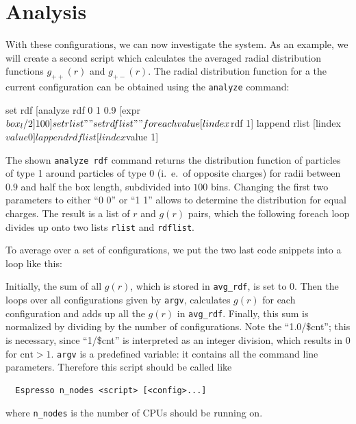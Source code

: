 \documentclass[
a4paper,                        %
11pt,                           %
twoside,                        %
footsepline,                    %
headsepline,                    %
headexclude,                    %
footexclude,                    %
pagesize,                       %
]{scrartcl}
\begin{document}
\section{Analysis}

With these configurations, we can now investigate the system. As an
example, we will create a second script which calculates the averaged
radial distribution functions $g_{++}(r)$ and $g_{+-}(r)$. The radial
distribution function for a the current configuration can be obtained
using the \verb|analyze| command:
\begin{tclcode}
  set rdf [analyze rdf 0 1 0.9 [expr $box_l/2] 100] set rlist "" set
  rdflist "" foreach value [lindex $rdf 1] { lappend rlist [lindex
    $value 0] lappend rdflist [lindex $value 1] }
\end{tclcode}
The shown \verb|analyze rdf| command returns the distribution function
of particles of type 1 around particles of type 0 (i.~e.\ of opposite
charges) for radii between $0.9$ and half the box length, subdivided
into $100$ bins.  Changing the first two parameters to either ``0 0''
or ``1 1'' allows to determine the distribution for equal charges. The
result is a list of $r$ and $g(r)$ pairs, which the following foreach
loop divides up onto two lists \verb|rlist| and \verb|rdflist|.

To average over a set of configurations, we put the two last code
snippets into a loop like this:
Initially, the sum of all $g(r)$, which is stored in \verb|avg_rdf|,
is set to 0.  Then the loops over all configurations given by
\verb|argv|, calculates $g(r)$ for each configuration and adds up all
the $g(r)$ in \verb|avg_rdf|.  Finally, this sum is normalized by
dividing by the number of configurations. Note the ``1.0/\$cnt''; this
is necessary, since ``1/\$cnt'' is interpreted as an integer division,
which results in 0 for $\text{cnt}>1$.  \verb|argv| is a predefined
variable: it contains all the command line parameters. Therefore this
script should be called like
\begin{verbatim}
  Espresso n_nodes <script> [<config>...]
\end{verbatim}
where \verb|n_nodes| is the number of CPUs \es should be running on.
\end{document}
